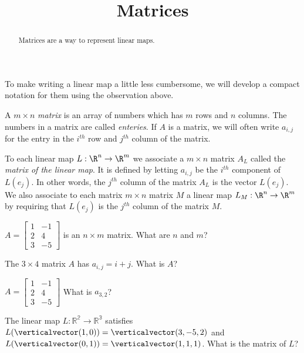 \documentclass{article}
\title{Matrices}
\begin{document}
\begin{abstract}
  Matrices are a way to represent linear maps.
\end{abstract}


	To make writing a linear map a little less cumbersome, we will develop a compact notation for them using the observation above. 
	
	\begin{definition}
		A $m \times n$ \textit{matrix} is an array of numbers which has $m$ rows and $n$ columns.  The numbers in a matrix are called \textit{enteries}. If $A$ is a matrix, 
		we will often write $a_{i,j}$ for the entry in the $i^{th}$  row and $j^{th}$ column of the matrix.
	\end{definition}
	
	\begin{definition}
		To each linear map $L: \R^n \to \R^m$  we associate a $m \times n$ matrix $A_L$ called the \textit{matrix of the linear map}.  It is defined 
		by letting $a_{i,j}$ be the $i^{th}$ component of $L(e_j)$.  In other words, the $j^{th}$ column of the matrix $A_L$ is the vector $L(e_j)$.  We also associate to each 
		matrix $m \times n$ matrix $M$ a linear map $L_M: \R^n \to \R^m$ by requiring that $L(e_j)$ is the $j^{th}$ column of the matrix $M$. 
	\end{definition}
	
	\begin{question}
		$A = \begin{bmatrix}
		1&-1\\2&4\\3&-5
		\end{bmatrix}$
		is an $n \times m$ matrix.  What are $n$ and $m$? 
	\end{question}
	
	\begin{question}
		The $3 \times 4$ matrix $A$ has $a_{i,j} = i+j$.  What is $A$?
	\end{question}
	
	\begin{question}
		$A = \begin{bmatrix}
		1&-1\\2&4\\3&-5
		\end{bmatrix}$
		 What is $a_{3,2}$?
	\end{question}
	
	\begin{question}
		The linear map $L:\mathbb{R^2}\to\mathbb{R^3}$ satisfies $L(\verticalvector(1,0)) = \verticalvector(3,-5,2)$ and $L(\verticalvector(0,1)) = \verticalvector(1,1,1)$. 
		 What is the matrix of $L$?
	\end{question}
	
\end{document}
